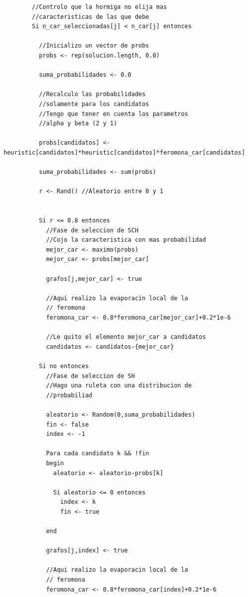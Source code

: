 \begin{lstlisting}
        //Controlo que la hormiga no elija mas
        //caracteristicas de las que debe
        Si n_car_seleccionadas[j] < n_car[j] entonces
        
          //Inicializo un vector de probs
          probs <- rep(solucion.length, 0.0)
          
          suma_probabilidades <- 0.0
          
          //Recalculo las probabilidades
          //solamente para los candidatos
          //Tengo que tener en cuenta los parametros
          //alpha y beta (2 y 1)
          
          probs[candidatos] <- heuristic[candidatos]*heuristic[candidatos]*feromona_car[candidatos]
          
          suma_probabilidades <- sum(probs)
          
          r <- Rand() //Aleatorio entre 0 y 1
          
          
          Si r <= 0.8 entonces
            //Fase de seleccion de SCH
            //Cojo la caracteristica con mas probabilidad
            mejor_car <- maximo(probs)
            mejor_car <- probs[mejor_car]
            
            grafos[j,mejor_car] <- true
            
            //Aqui realizo la evaporacin local de la
            // feromona
            feromona_car <- 0.8*feromona_car[mejor_car]+0.2*1e-6
            
            //Le quito el elemento mejor_car a candidatos
            candidatos <- candidatos-{mejor_car}
            
          Si no entonces
            //Fase de seleccion de SH
            //Hago una ruleta con una distribucion de
            //probabiliad
            
            aleatorio <- Random(0,suma_probabilidades)
            fin <- false
            index <- -1
            
            Para cada candidato k && !fin
            begin
              aleatorio <- aleatorio-probs[k]
              
              Si aleatorio <= 0 entonces
                index <- k
                fin <- true
                
            end
            
            grafos[j,index] <- true
            
            //Aqui realizo la evaporacin local de la
            // feromona
            feromona_car <- 0.8*feromona_car[index]+0.2*1e-6
                        

\end{lstlisting}
